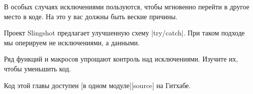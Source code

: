 В особых случаях исключениями пользуются, чтобы мгновенно перейти в другое место
в коде. На это у вас должны быть веские причины.

Проект Slingshot предлагает улучшенную схему \spverb|try/catch|. При таком подходе мы
оперируем не исключениями, а данными.

Ряд функций и макросов упрощают контроль над исключениями. Изучите их, чтобы
уменьшить код.


Код этой главы доступен [в одном модуле][source] на Гитхабе.
